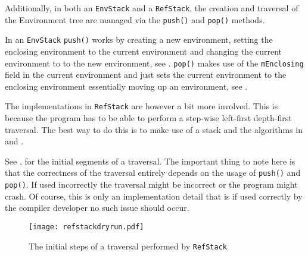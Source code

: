 Additionally, in both an \texttt{EnvStack} and a
\texttt{RefStack}, the creation and traversal of the Environment
tree are managed via the \texttt{push()} and \texttt{pop()}
methods.

In an \texttt{EnvStack} \texttt{push()} works by creating a new
environment, setting the enclosing environment to the current
environment and changing the current environment to to the new
environment, see . \texttt{pop()} makes
use of the \texttt{mEnclosing} field in the current environment
and just sets the current environment to the enclosing
environment essentially moving up an environment, see
.





The implementations in \texttt{RefStack} are however a bit more
involved. This is because the program has to be able to perform
a step-wise left-first depth-first traversal. The best way
to do this is to make use of a stack and the algorithms
in  and .





See , for the initial segments of a
traversal. The important thing to note here is that the
correctness of the traversal entirely depends on the usage of
\texttt{push()} and \texttt{pop()}. If used incorrectly the
traversal might be incorrect or the program might crash. Of
course, this is only an implementation detail that is if used
correctly by the compiler developer no such issue should occur.

\begin{figure}[H]
\centering
\begin{mdframed}[backgroundcolor=UMPaleRed]
\texttt{[image: refstackdryrun.pdf]}
\end{mdframed}
\caption{The initial steps of a traversal performed by
\texttt{RefStack}}
\label{fig:refstackdryrun}
\end{figure}


